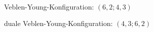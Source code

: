 \begin{beispiel}\
	\begin{figure}[H] %
		\begin{center}
			
			\caption{Veblen-Young-Konfiguration: $(6,2;4,3)$}
		\end{center}
	\end{figure}
	\begin{figure}[H] %
		\begin{center}
			
			\caption{duale Veblen-Young-Konfiguration: $(4,3;6,2)$}
		\end{center}
	\end{figure}	
\end{beispiel}

